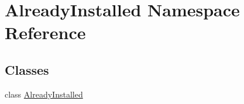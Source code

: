 \hypertarget{namespace_already_installed}{\section{Already\-Installed Namespace Reference}
\label{namespace_already_installed}
}
\subsection*{Classes}
\begin{DoxyCompactItemize}
\item 
class \hyperlink{class_already_installed_1_1_already_installed}{Already\-Installed}
\end{DoxyCompactItemize}
